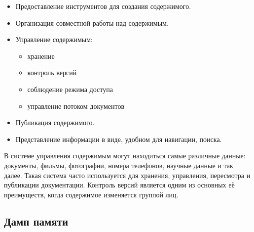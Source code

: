 \documentclass[20pt]{article}
\begin{document}
\begin{itemize}
  \item Предоставление инструментов для создания содержимого.
  \item Организация совместной работы над содержимым.
  \item Управление содержимым:
  \begin{itemize}
    \item хранение
    \item контроль версий
    \item соблюдение режима доступа
    \item управление потоком документов
  \end{itemize}
  \item Публикация содержимого.
  \item Представление информации в виде, удобном для навигации, поиска.
\end{itemize}

В системе управления содержимым могут находиться самые различные данные:
документы, фильмы, фотографии, номера телефонов, научные данные и так далее.
Такая система часто используется для хранения, управления, пересмотра и
публикации документации. Контроль версий является одним из основных её
преимуществ, когда содержимое изменяется группой лиц.

\subsection{Дамп памяти}
\end{document}
